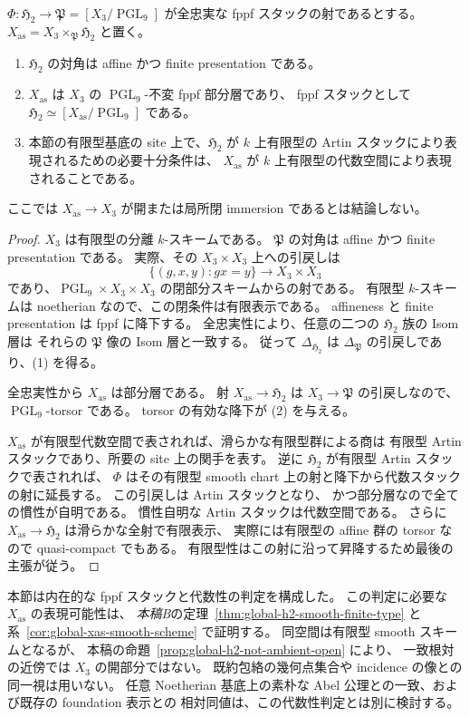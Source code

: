 \begin{proposition}[相対認識から対角と代数性判定への還元]
\label{prop:relative-h2-algebraicity-reduction}
$\Phi:\mathfrak H_2\to\mathfrak P=[X_3/\operatorname{PGL}_9]$
が全忠実な fppf スタックの射であるとする。
$X_{\mathrm{as}}=X_3\times_{\mathfrak P}\mathfrak H_2$ と置く。
\begin{enumerate}
\item $\mathfrak H_2$ の対角は affine かつ finite presentation である。
\item $X_{\mathrm{as}}$ は $X_3$ の $\operatorname{PGL}_9$-不変 fppf 部分層であり、
  fppf スタックとして $\mathfrak H_2\simeq
  [X_{\mathrm{as}}/\operatorname{PGL}_9]$ である。
\item 本節の有限型基底の site 上で、$\mathfrak H_2$ が
  $k$ 上有限型の Artin スタックにより表現されるための必要十分条件は、
  $X_{\mathrm{as}}$ が $k$ 上有限型の代数空間により表現されることである。
\end{enumerate}
ここでは $X_{\mathrm{as}}\to X_3$ が開または局所閉 immersion であるとは結論しない。
\end{proposition}
\begin{proof}
$X_3$ は有限型の分離 $k$-スキームである。
$\mathfrak P$ の対角は affine かつ finite presentation である。
実際、その $X_3\times X_3$ 上への引戻しは
\[
 \{(g,x,y):gx=y\}\longrightarrow X_3\times X_3
\]
であり、$\operatorname{PGL}_9\times X_3\times X_3$ の閉部分スキームからの射である。
有限型 $k$-スキームは noetherian なので、この閉条件は有限表示である。
affineness と finite presentation は fppf に降下する。
全忠実性により、任意の二つの $\mathfrak H_2$ 族の Isom 層は
それらの $\mathfrak P$ 像の Isom 層と一致する。
従って $\Delta_{\mathfrak H_2}$ は $\Delta_{\mathfrak P}$ の引戻しであり、(1) を得る。

全忠実性から $X_{\mathrm{as}}$ は部分層である。
射 $X_{\mathrm{as}}\to\mathfrak H_2$ は
$X_3\to\mathfrak P$ の引戻しなので、$\operatorname{PGL}_9$-torsor である。
torsor の有効な降下が (2) を与える。

$X_{\mathrm{as}}$ が有限型代数空間で表されれば、滑らかな有限型群による商は
有限型 Artin スタックであり、所要の site 上の関手を表す。
逆に $\mathfrak H_2$ が有限型 Artin スタックで表されれば、
$\Phi$ はその有限型 smooth chart 上の射と降下から代数スタックの射に延長する。
この引戻しは Artin スタックとなり、
かつ部分層なので全ての慣性が自明である。
慣性自明な Artin スタックは代数空間である。
さらに $X_{\mathrm{as}}\to\mathfrak H_2$ は滑らかな全射で有限表示、
実際には有限型の affine 群の torsor なので quasi-compact でもある。
有限型性はこの射に沿って昇降するため最後の主張が従う。
\end{proof}


本節は内在的な fppf スタックと代数性の判定を構成した。
この判定に必要な $X_{\mathrm{as}}$ の表現可能性は、
\emph{本稿B}の定理~\ref{thm:global-h2-smooth-finite-type} と
系~\ref{cor:global-xas-smooth-scheme} で証明する。
同空間は有限型 smooth スキームとなるが、
本稿の命題~\ref{prop:global-h2-not-ambient-open} により、
一致根対の近傍では $X_3$ の開部分ではない。
既約包絡の幾何点集合や incidence の像との同一視は用いない。
任意 Noetherian 基底上の素朴な Abel 公理との一致、および既存の foundation 表示との
相対同値は、この代数性判定とは別に検討する。
